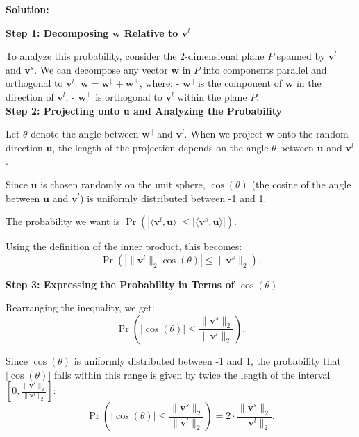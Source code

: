 \documentclass{article}
\newenvironment{solution}{\color{blue} \smallskip \textbf{Solution:}}{}
\begin{document}
\begin{enumerate}[(a)]
    \begin{solution}


\textbf{Step 1: Decomposing \(\mathbf{w}\) Relative to \(\mathbf{v}^l\)}

To analyze this probability, consider the 2-dimensional plane \(P\) spanned by \(\mathbf{v}^l\) and \(\mathbf{v}^s\). We can decompose any vector \(\mathbf{w}\) in \(P\) into components parallel and orthogonal to \(\mathbf{v}^l\): 
\(\mathbf{w} = \mathbf{w}^\parallel + \mathbf{w}^\perp\),
where:
- \(\mathbf{w}^\parallel\) is the component of \(\mathbf{w}\) in the direction of \(\mathbf{v}^l\),
- \(\mathbf{w}^\perp\) is orthogonal to \(\mathbf{v}^l\) within the plane \(P\).\\

\textbf{Step 2: Projecting onto \(\mathbf{u}\) and Analyzing the Probability}

Let \(\theta\) denote the angle between \(\mathbf{w}^\parallel\) and \(\mathbf{v}^l\). When we project \(\mathbf{w}\) onto the random direction \(\mathbf{u}\), the length of the projection depends on the angle \(\theta\) between \(\mathbf{u}\) and \(\mathbf{v}^l\).

Since \(\mathbf{u}\) is chosen randomly on the unit sphere, \(\cos(\theta)\) (the cosine of the angle between \(\mathbf{u}\) and \(\mathbf{v}^l\)) is uniformly distributed between -1 and 1. 

The probability we want is 
\(\Pr\left( \left| \langle \mathbf{v}^l, \mathbf{u} \rangle \right| \leq \left| \langle \mathbf{v}^s, \mathbf{u} \rangle \right| \right)\).

Using the definition of the inner product, this becomes:
\[
\Pr\left( \left| \|\mathbf{v}^l\|_2 \cos(\theta) \right| \leq \|\mathbf{v}^s\|_2 \right).
\]

\textbf{Step 3: Expressing the Probability in Terms of \(\cos(\theta)\)}

Rearranging the inequality, we get:
\[
\Pr\left( |\cos(\theta)| \leq \frac{\|\mathbf{v}^s\|_2}{\|\mathbf{v}^l\|_2} \right).
\]

Since \(\cos(\theta)\) is uniformly distributed between -1 and 1, the probability that \(|\cos(\theta)|\) falls within this range is given by twice the length of the interval \(\left[0, \frac{\|\mathbf{v}^s\|_2}{\|\mathbf{v}^l\|_2}\right]\):
\[
\Pr\left( |\cos(\theta)| \leq \frac{\|\mathbf{v}^s\|_2}{\|\mathbf{v}^l\|_2} \right) = 2 \cdot \frac{\|\mathbf{v}^s\|_2}{\|\mathbf{v}^l\|_2}.
\]






\end{solution}
\end{enumerate}
\end{document}
